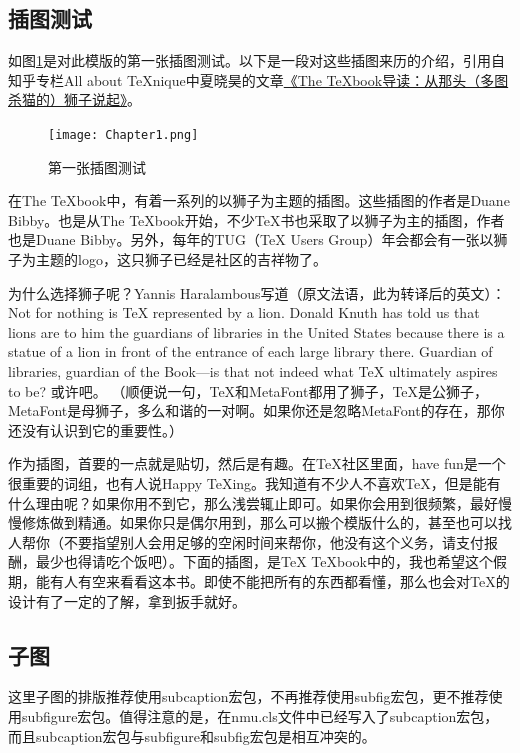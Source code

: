\subsection{插图测试}

如图\ref{fig:first_image_test}是对此模版的第一张插图测试。以下是一段对这些插图来历的介绍，引用自知乎专栏All about TeXnique中夏晓昊的文章\href{http://zhuanlan.zhihu.com/LaTeX/19669122}{《The TeXbook导读：从那头（多图杀猫的）狮子说起》}。

\begin{figure}[htb]
	\centering
	\texttt{[image: Chapter1.png]}
	\caption{第一张插图测试}
	\label{fig:first_image_test}
\end{figure}

在The TeXbook中，有着一系列的以狮子为主题的插图。这些插图的作者是Duane Bibby。也是从The TeXbook开始，不少TeX书也采取了以狮子为主的插图，作者也是Duane Bibby。另外，每年的TUG（TeX Users Group）年会都会有一张以狮子为主题的logo，这只狮子已经是社区的吉祥物了。

为什么选择狮子呢？Yannis Haralambous写道（原文法语，此为转译后的英文）：Not for nothing is TeX represented by a lion. Donald Knuth has told us that lions are to him the guardians of libraries in the United States because there is a statue of a lion in front of the entrance of each large library there. Guardian of libraries, guardian of the Book—is that not indeed what TeX ultimately aspires to be? 或许吧。 （顺便说一句，TeX和MetaFont都用了狮子，TeX是公狮子，MetaFont是母狮子，多么和谐的一对啊。如果你还是忽略MetaFont的存在，那你还没有认识到它的重要性。）

作为插图，首要的一点就是贴切，然后是有趣。在TeX社区里面，have fun是一个很重要的词组，也有人说Happy TeXing。我知道有不少人不喜欢TeX，但是能有什么理由呢？如果你用不到它，那么浅尝辄止即可。如果你会用到很频繁，最好慢慢修炼做到精通。如果你只是偶尔用到，那么可以搬个模版什么的，甚至也可以找人帮你（不要指望别人会用足够的空闲时间来帮你，他没有这个义务，请支付报酬，最少也得请吃个饭吧）。下面的插图，是TeX TeXbook中的，我也希望这个假期，能有人有空来看看这本书。即使不能把所有的东西都看懂，那么也会对TeX的设计有了一定的了解，拿到扳手就好。

\subsection{子图}
这里子图的排版推荐使用subcaption宏包，不再推荐使用subfig宏包，更不推荐使用subfigure宏包。值得注意的是，在nmu.cls文件中已经写入了subcaption宏包，而且subcaption宏包与subfigure和subfig宏包是相互冲突的。

